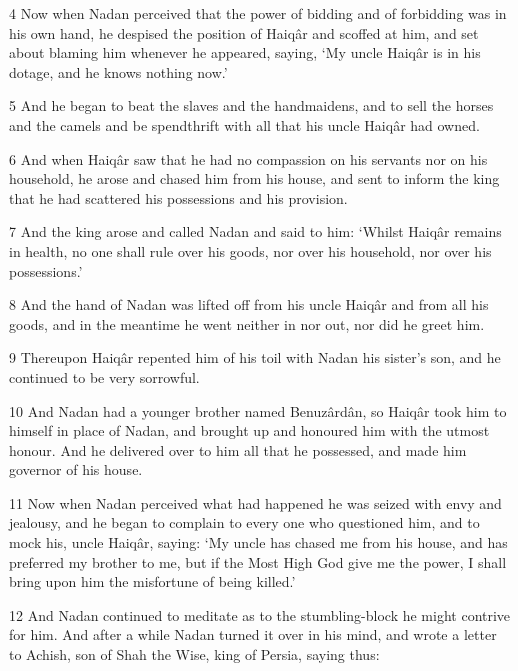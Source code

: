 \par 4 Now when Nadan perceived that the power of bidding and of forbidding was in his own hand, he despised the position of Haiqâr and scoffed at him, and set about blaming him whenever he appeared, saying, ‘My uncle Haiqâr is in his dotage, and he knows nothing now.’

\par 5 And he began to beat the slaves and the handmaidens, and to sell the horses and the camels and be spendthrift with all that his uncle Haiqâr had owned.

\par 6 And when Haiqâr saw that he had no compassion on his servants nor on his household, he arose and chased him from his house, and sent to inform the king that he had scattered his possessions and his provision.

\par 7 And the king arose and called Nadan and said to him: ‘Whilst Haiqâr remains in health, no one shall rule over his goods, nor over his household, nor over his possessions.’

\par 8 And the hand of Nadan was lifted off from his uncle Haiqâr and from all his goods, and in the meantime he went neither in nor out, nor did he greet him.

\par 9 Thereupon Haiqâr repented him of his toil with Nadan his sister's son, and he continued to be very sorrowful.

\par 10 And Nadan had a younger brother named Benuzârdân, so Haiqâr took him to himself in place of Nadan, and brought up and honoured him with the utmost honour. And he delivered over to him all that he possessed, and made him governor of his house.

\par 11 Now when Nadan perceived what had happened he was seized with envy and jealousy, and he began to complain to every one who questioned him, and to mock his, uncle Haiqâr, saying: ‘My uncle has chased me from his house, and has preferred my brother to me, but if the Most High God give me the power, I shall bring upon him the misfortune of being killed.’

\par 12 And Nadan continued to meditate as to the stumbling-block he might contrive for him. And after a while Nadan turned it over in his mind, and wrote a letter to Achish, son of Shah the Wise, king of Persia, saying thus:


